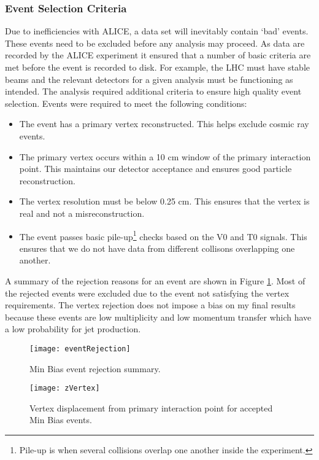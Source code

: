 \subsubsection{Event Selection Criteria}
Due to inefficiencies with ALICE, a data set will inevitably contain `bad' events.  These events need to be excluded before any analysis may proceed.  As data are recorded by the ALICE experiment it ensured that a number of basic criteria are met before the event is recorded to disk.  For example, the LHC must have stable beams and the relevant detectors for a given analysis must be functioning as intended.  The analysis required additional criteria to ensure high quality event selection.  Events were required to meet the following conditions:

\begin{itemize}
  \item The event has a primary vertex reconstructed.  This helps exclude cosmic ray events.
  \item The primary vertex occurs within a 10 cm window of the primary interaction point.  This maintains our detector acceptance and ensures good particle reconstruction.
  \item The vertex resolution must be below 0.25 cm.  This ensures that the vertex is real and not a misreconstruction.
  \item The event passes basic pile-up\footnote{Pile-up is when several collisions overlap one another inside the experiment.} checks based on the V0 and T0 signals.  This ensures that we do not have data from different collisons overlapping one another.
\end{itemize}


A summary of the rejection reasons for an event are shown in Figure \ref{fig:eventqa}.  Most of the rejected events were excluded due to the event not satisfying the vertex requirements.  The vertex rejection does not impose a bias on my final results because these events are low multiplicity and low momentum transfer which have a low probability for jet production.

\begin{figure}[h]
\texttt{[image: eventRejection]}
\centering
\caption{Min Bias event rejection summary.}
\label{fig:eventqa}
\end{figure}

\begin{figure}[h]
\texttt{[image: zVertex]}
\centering
\caption{Vertex displacement from primary interaction point for accepted Min Bias events.}
\label{fig:vertrec}
\end{figure}


